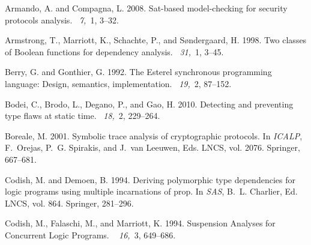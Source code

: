 \documentclass{tlp}
\begin{document}
\begin{thebibliography}{}

{\sc Armando, A.} {\sc and} {\sc Compagna, L.} 2008.
\newblock Sat-based model-checking for security protocols analysis.
~{\em 7,\/}~1,
  3--32.

{\sc Armstrong, T.}, {\sc Marriott, K.}, {\sc Schachte, P.}, {\sc and} {\sc
  S{\o}ndergaard, H.} 1998.
\newblock Two classes of {Boolean} functions for dependency analysis.
~{\em 31,\/}~1, 3--45.

{\sc Berry, G.} {\sc and} {\sc Gonthier, G.} 1992.
\newblock The {{\sc Esterel}} synchronous programming language: Design,
  semantics, implementation.
~{\em 19,\/}~2, 87--152.

{\sc Bodei, C.}, {\sc Brodo, L.}, {\sc Degano, P.}, {\sc and} {\sc Gao, H.}
  2010.
\newblock Detecting and preventing type flaws at static time.
~{\em 18,\/}~2, 229--264.

{\sc Boreale, M.} 2001.
\newblock Symbolic trace analysis of cryptographic protocols.
\newblock In {\em ICALP}, {F.~Orejas}, {P.~G. Spirakis}, {and} {J.~van
  Leeuwen}, Eds. LNCS, vol. 2076. Springer, 667--681.

{\sc Codish, M.} {\sc and} {\sc Demoen, B.} 1994.
\newblock Deriving polymorphic type dependencies for logic programs using
  multiple incarnations of prop.
\newblock In {\em SAS}, {B.~L. Charlier}, Ed. LNCS, vol. 864. Springer,
  281--296.

{\sc Codish, M.}, {\sc Falaschi, M.}, {\sc and} {\sc Marriott, K.} 1994.
\newblock Suspension {A}nalyses for {C}oncurrent {L}ogic {P}rograms.
~{\em
  16,\/}~3, 649--686.


\end{thebibliography}
\end{document}

